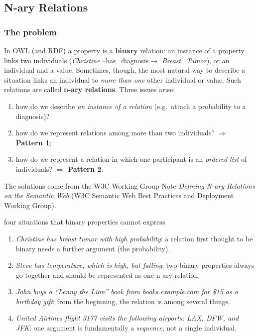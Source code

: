\subsection{N-ary Relations}
\label{sec:n-ary-relations}

\subsubsection{The problem}

In OWL (and RDF) a property is a \textbf{binary} relation: an instance of a property
links two individuals (\emph{Christine} --has\_diagnosis$\to$ \emph{Breast\_Tumor}), or
an individual and a value. Sometimes, though, the most natural way to describe a
situation links an individual to \emph{more than one} other individual or value. Such
relations are called \textbf{n-ary relations}. Three issues arise:
\begin{enumerate}[nosep]
  \item how do we describe \emph{an instance of a relation} (e.g.\ attach a probability
        to a diagnosis)?
  \item how do we represent relations among more than two individuals?
        $\Rightarrow$ \textbf{Pattern 1};
  \item how do we represent a relation in which one participant is an \emph{ordered
        list} of individuals? $\Rightarrow$ \textbf{Pattern 2}.
\end{enumerate}
The solutions come from the W3C Working Group Note \emph{Defining N-ary Relations on the
Semantic Web} (W3C Semantic Web Best Practices and Deployment Working Group).

\begin{nbexample}{four situations that binary properties cannot express}
\begin{enumerate}[nosep]
  \item \emph{Christine has breast tumor with high probability}: a relation first thought
        to be binary needs a further argument (the probability).
  \item \emph{Steve has temperature, which is high, but falling}: two binary properties
        always go together and should be represented as one n-ary relation.
  \item \emph{John buys a ``Lenny the Lion'' book from books.example.com for \$15 as a
        birthday gift}: from the beginning, the relation is among several things.
  \item \emph{United Airlines flight 3177 visits the following airports: LAX, DFW, and
        JFK}: one argument is fundamentally a \emph{sequence}, not a single individual.
\end{enumerate}
\end{nbexample}


